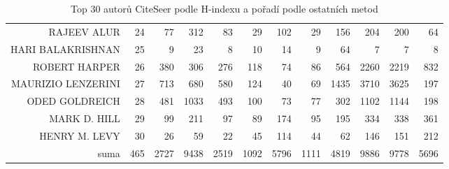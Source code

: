 \documentclass{bakalarka}
\begin{document}
\begin{table}[!ht]
\begin{sideways}
\begin{scriptsize}
\begin{tabular}{r|r|rrrrrrrrrr}
RAJEEV ALUR&24&77&312&83&29&102&29&156&204&200&64\\
HARI BALAKRISHNAN&25&9&23&8&10&14&9&64&7&7&8\\
ROBERT HARPER&26&380&306&276&118&74&86&564&2260&2219&832\\
MAURIZIO LENZERINI&27&713&680&580&124&40&69&1435&3710&3625&197\\
ODED GOLDREICH&28&481&1033&493&100&73&77&302&1102&1144&198\\
MARK D. HILL&29&99&211&97&89&174&95&195&334&338&361\\
HENRY M. LEVY&30&26&59&22&45&114&44&62&146&151&212\\
\midrule
suma&465&2727&9438&2519&1092&5796&1111&4819&9886&9778&5696\\
\bottomrule
\end{tabular}
\end{scriptsize}
\end{sideways}
\caption{Top 30 autorů CiteSeer podle H-indexu a pořadí podle ostatních metod}
\label{tab:ranks3}
\end{table}
\end{document}
